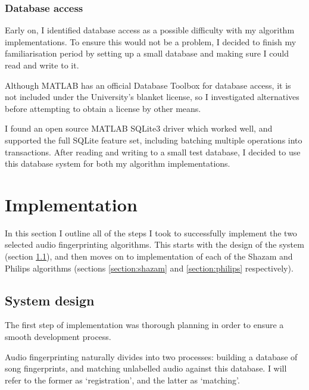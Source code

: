 \documentclass[12pt,a4paper,twoside,openright]{report}
\begin{document}
\subsection{Database access}
\label{section:dbaccess}

Early on, I identified database access as a possible difficulty with my algorithm implementations. To ensure this would not be a problem, I decided to finish my familiarisation period by setting up a small database and making sure I could read and write to it.

Although MATLAB has an official Database Toolbox for database access, it is not included under the University's blanket license, so I investigated alternatives before attempting to obtain a license by other means.

I found an open source MATLAB SQLite3 driver \cite{Yamaguchi14} which worked well, and supported the full SQLite feature set, including batching multiple operations into transactions. After reading and writing to a small test database, I decided to use this database system for both my algorithm implementations.





\chapter{Implementation}
\label{implementation}

In this section I outline all of the steps I took to successfully implement the two selected audio fingerprinting algorithms. This starts with the design of the system (section \ref{section:systemdesign}), and then moves on to implementation of each of the Shazam and Philips algorithms (sections \ref{section:shazam} and \ref{section:philips} respectively).


\section{System design}
\label{section:systemdesign}

The first step of implementation was thorough planning in order to ensure a smooth development process. 

Audio fingerprinting naturally divides into two processes: building a database of song fingerprints, and matching unlabelled audio against this database. I will refer to the former as `registration', and the latter as `matching'.
\end{document}
